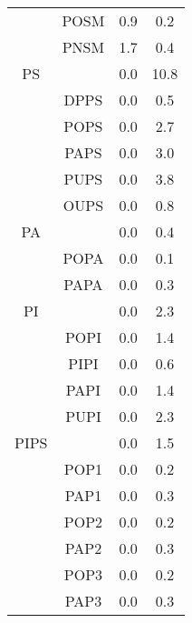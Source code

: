 \documentclass[9pt]{article}
\begin{document}
\begin{table}
\begin{tabular}{|c||c|cc|}
{} &POSM                         & 0.9      & 0.2                           \\
{} &PNSM                         & 1.7     & 0.4                           \\
\hline
\hline
PS &{} &0.0&10.8\\ \hline
{} &DPPS                         & 0.0      & 0.5                           \\
{} &POPS                         & 0.0      & 2.7                           \\
{} &PAPS                         & 0.0      & 3.0                           \\
{} &PUPS                         & 0.0      & 3.8   			\\      
{} &OUPS                         & 0.0      & 0.8                           \\
\hline       
\hline          
PA &{} &0.0&0.4\\ \hline
{} &POPA                         & 0.0      & 0.1                          \\
{} &PAPA                         & 0.0      & 0.3                           \\
\hline
\hline
PI &{} &0.0&2.3\\ \hline
{} &POPI                         & 0.0      & 1.4                         \\
{} &PIPI                         & 0.0      & 0.6                           \\
{} &PAPI                         & 0.0      & 1.4                           \\
{} &PUPI                         & 0.0      & 2.3                           \\
\hline
\hline
PIPS &{} &0.0&1.5\\ \hline
{} &POP1                         & 0.0      & 0.2                           \\
{} &PAP1                         & 0.0      & 0.3                           \\
{} &POP2                         & 0.0      & 0.2                           \\
{} &PAP2                         & 0.0      & 0.3                           \\
{} &POP3                         & 0.0      & 0.2                           \\
{} &PAP3                         & 0.0      & 0.3                           \\
\hline
\end{tabular}
\end{table}
\end{document}
